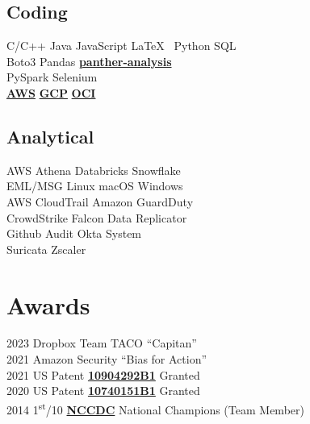\documentclass[letterpaper]{deedy-resume} %
\begin{document}
\begin{minipage}[t]{0.33\textwidth}
\subsection{Coding}
C/C++ \textbullet{} Java \textbullet{} JavaScript \textbullet{} \LaTeX\ \textbullet{} Python \textbullet{} SQL \\
Boto3 \textbullet{}  Pandas \textbullet{} \textbf{\href{https://docs.panther.com/}{panther-analysis}} \\
PySpark \textbullet{} Selenium \\
\textbf{\href{https://aws.amazon.com/}{AWS}} \textbullet{} \textbf{\href{https://console.cloud.google.com/}{GCP}} \textbullet{} \textbf{\href{https://www.oracle.com/cloud/}{OCI}}

\sectionspace %

\subsection{Analytical}
AWS Athena \textbullet{} Databricks \textbullet{} Snowflake \\
EML/MSG \textbullet{} Linux \textbullet{} macOS\textbullet{} Windows \\
AWS CloudTrail \textbullet{} Amazon GuardDuty \\
CrowdStrike Falcon Data Replicator \\
Github Audit \textbullet{} Okta System \\
Suricata \textbullet{} Zscaler \\

\sectionspace %



\section{Awards}
2023 Dropbox Team TACO “Capitan” \\
2021 Amazon Security “Bias for Action” \\
2021 US Patent \textbf{\href{https://patents.google.com/patent/US10904292B1/en}{10904292B1}} Granted \\
2020 US Patent \textbf{\href{https://patents.google.com/patent/US10740151B1/en}{10740151B1}} Granted \\
2014 1\textsuperscript{st}/10 \textbf{\href{https://www.nationalccdc.org/}{NCCDC}} National Champions (Team Member) \\


\end{minipage}
\end{document}
